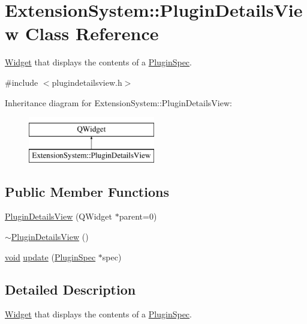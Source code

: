 \hypertarget{class_extension_system_1_1_plugin_details_view}{\section{Extension\-System\-:\-:Plugin\-Details\-View Class Reference}
\label{class_extension_system_1_1_plugin_details_view}
}


\hyperlink{class_widget}{Widget} that displays the contents of a \hyperlink{class_extension_system_1_1_plugin_spec}{Plugin\-Spec}.  




{\ttfamily \#include $<$plugindetailsview.\-h$>$}

Inheritance diagram for Extension\-System\-:\-:Plugin\-Details\-View\-:\begin{figure}[H]
\begin{center}
\leavevmode
\includegraphics[height=2.000000cm]{class_extension_system_1_1_plugin_details_view}
\end{center}
\end{figure}
\subsection*{Public Member Functions}
\begin{DoxyCompactItemize}
\item 
\hyperlink{class_extension_system_1_1_plugin_details_view_a8f7deb5b304aba85440152d7f013d7ae}{Plugin\-Details\-View} (Q\-Widget $\ast$parent=0)
\item 
\hyperlink{class_extension_system_1_1_plugin_details_view_a9ad4e8bdf2f3e42e1ac0f024697faed5}{$\sim$\-Plugin\-Details\-View} ()
\item 
\hyperlink{group___u_a_v_objects_plugin_ga444cf2ff3f0ecbe028adce838d373f5c}{void} \hyperlink{class_extension_system_1_1_plugin_details_view_a988a4f37a2b5719f3d8f52ff1958ba88}{update} (\hyperlink{class_extension_system_1_1_plugin_spec}{Plugin\-Spec} $\ast$spec)
\end{DoxyCompactItemize}


\subsection{Detailed Description}
\hyperlink{class_widget}{Widget} that displays the contents of a \hyperlink{class_extension_system_1_1_plugin_spec}{Plugin\-Spec}. 

